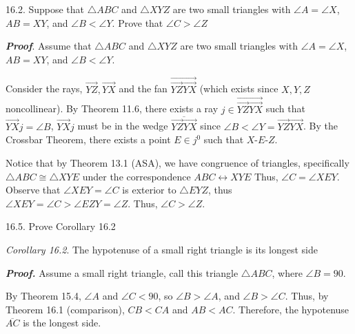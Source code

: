\documentclass{report}
\begin{document}
    \bigbreak \noindent 
    \begin{mdframed}
        16.2. Suppose that $\triangle ABC$ and $\triangle XYZ$ are two small triangles with $\angle A = \angle X$, $AB = XY$, and $\angle B < \angle Y$. Prove that $ \angle C > \angle Z $
    \end{mdframed}
    \bigbreak \noindent 
    \textbf{\textit{Proof}}. Assume that $\triangle ABC$ and $\triangle XYZ$ are two small triangles with $\angle A = \angle X$, $AB = XY$, and $\angle B  < \angle Y$.
    \bigbreak \noindent 
    \begin{figure}[ht]
        \centering
        \label{fig:tri7}
    \end{figure}
    \bigbreak \noindent 
    Consider the rays, $\overrightarrow{YZ}, \overrightarrow{YX}$ and the fan $\overrightarrow{\overrightarrow{YZ}\overrightarrow{YX}} $ (which exists since $X,Y,Z$ noncollinear). By Theorem 11.6, there exists a ray $j\in \overrightarrow{\overrightarrow{YZ}\overrightarrow{YX}}$ such that $\overrightarrow{YX}j = \angle B$, $\overrightarrow{YX}j $ must be in the wedge $\overline{\overrightarrow{YZ}\overrightarrow{YX}}$ since $\angle B < \angle Y = \overrightarrow{YZ}\overrightarrow{YX} $.
    \bigbreak \noindent 
    By the Crossbar Theorem, there exists a point $E \in j^{0}$ such that $ X\text{-}E\text{-}Z$.
    \pagebreak \bigbreak \noindent 
    \begin{figure}[ht]
        \centering
        \label{fig:tri11}
    \end{figure}
    \bigbreak \noindent 
    Notice that by Theorem 13.1 (ASA), we have congruence of triangles, specifically $\triangle ABC \cong \triangle XYE$ under the correspondence $ABC \leftrightarrow XYE$
    \bigbreak \noindent 
    Thus, $\angle C = \angle XEY$. Observe that $\angle XEY = \angle C$ is exterior to $\triangle EYZ$, thus $\angle XEY = \angle C > \angle EZY = \angle Z$. Thus, $\angle C > \angle Z$. \endpf

    \bigbreak \noindent 
    \begin{mdframed}
        16.5. Prove Corollary 16.2
    \end{mdframed}
    \bigbreak \noindent 
    \begin{remark}
        \textit{Corollary 16.2}. The hypotenuse of a small right triangle is its longest side
    \end{remark}
    \bigbreak \noindent 
    \textbf{\textit{Proof.}} Assume a small right triangle, call this triangle $\triangle ABC$, where $\angle B = 90$.
    \bigbreak \noindent 
    \begin{figure}[ht]
        \centering
        \label{fig:tri}
    \end{figure}
    \bigbreak \noindent 
    By Theorem 15.4, $\angle A$ and $\angle C < 90$, so $\angle B > \angle A $, and $\angle B > \angle  C$. Thus, by Theorem 16.1 (comparison), $CB < CA$ and $AB <  AC$. Therefore, the hypotenuse  $\overline{AC}$ is the longest side. \endpf
    
\end{document}
